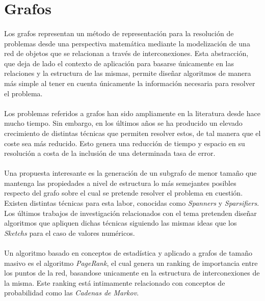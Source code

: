 \documentclass{subfiles}
\begin{document}
    \section{Grafos}
    \label{sec:introduction_graphs}

      \paragraph{}
      Los grafos representan un método de representación para la resolución de problemas desde una perspectiva matemática mediante la modelización de una red de objetos que se relacionan a través de interconexiones. Esta abstracción, que deja de lado el contexto de aplicación para basarse únicamente en las relaciones y la estructura de las mismas, permite diseñar algoritmos de manera más simple al tener en cuenta únicamente la información necesaria para resolver el problema.

      \paragraph{}
      Los problemas referidos a grafos han sido ampliamente en la literatura desde hace mucho tiempo. Sin embargo, en los últimos años se ha producido un elevado crecimiento de distintas técnicas que permiten resolver estos, de tal manera que el coste sea más reducido. Esto genera una reducción de tiempo y espacio en su resolución a costa de la inclusión de una determinada tasa de error.

      \paragraph{}
      Una propuesta interesante es la generación de un subgrafo de menor tamaño que mantenga las propiedades a nivel de estructura lo más semejantes posibles respecto del grafo sobre el cual se pretende resolver el problema en cuestión. Existen distintas técnicas para esta labor, conocidas como \emph{Spanners} y \emph{Sparsifiers}. Los últimos trabajos de investigación relacionados con el tema pretenden diseñar algoritmos que apliquen dichas técnicas siguiendo las mismas ideas que los \emph{Sketchs} para el caso de valores numéricos.

      \paragraph{}
      Un algoritmo basado en conceptos de estadística y aplicado a grafos de tamaño masivo es el algoritmo \emph{PageRank}, el cual genera un ranking de importancia entre los puntos de la red, basandose unicamente en la estructura de interconexiones de la misma. Este ranking está intimamente relacionado con conceptos de probabilidad como las \emph{Cadenas de Markov}.
\end{document}
